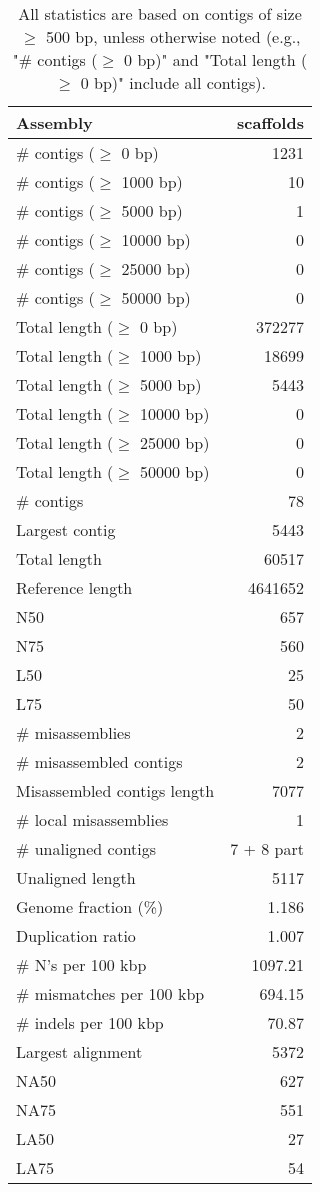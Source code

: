 \documentclass[12pt,a4paper]{article}
\begin{document}
\begin{table}[ht]
\begin{center}
\caption{All statistics are based on contigs of size $\geq$ 500 bp, unless otherwise noted (e.g., "\# contigs ($\geq$ 0 bp)" and "Total length ($\geq$ 0 bp)" include all contigs).}
\begin{tabular}{|l*{1}{|r}|}
\hline
Assembly & scaffolds \\ \hline
\# contigs ($\geq$ 0 bp) & 1231 \\ \hline
\# contigs ($\geq$ 1000 bp) & 10 \\ \hline
\# contigs ($\geq$ 5000 bp) & 1 \\ \hline
\# contigs ($\geq$ 10000 bp) & 0 \\ \hline
\# contigs ($\geq$ 25000 bp) & 0 \\ \hline
\# contigs ($\geq$ 50000 bp) & 0 \\ \hline
Total length ($\geq$ 0 bp) & 372277 \\ \hline
Total length ($\geq$ 1000 bp) & 18699 \\ \hline
Total length ($\geq$ 5000 bp) & 5443 \\ \hline
Total length ($\geq$ 10000 bp) & 0 \\ \hline
Total length ($\geq$ 25000 bp) & 0 \\ \hline
Total length ($\geq$ 50000 bp) & 0 \\ \hline
\# contigs & 78 \\ \hline
Largest contig & 5443 \\ \hline
Total length & 60517 \\ \hline
Reference length & 4641652 \\ \hline
N50 & 657 \\ \hline
N75 & 560 \\ \hline
L50 & 25 \\ \hline
L75 & 50 \\ \hline
\# misassemblies & 2 \\ \hline
\# misassembled contigs & 2 \\ \hline
Misassembled contigs length & 7077 \\ \hline
\# local misassemblies & 1 \\ \hline
\# unaligned contigs & 7 + 8 part \\ \hline
Unaligned length & 5117 \\ \hline
Genome fraction (\%) & 1.186 \\ \hline
Duplication ratio & 1.007 \\ \hline
\# N's per 100 kbp & 1097.21 \\ \hline
\# mismatches per 100 kbp & 694.15 \\ \hline
\# indels per 100 kbp & 70.87 \\ \hline
Largest alignment & 5372 \\ \hline
NA50 & 627 \\ \hline
NA75 & 551 \\ \hline
LA50 & 27 \\ \hline
LA75 & 54 \\ \hline
\end{tabular}
\end{center}
\end{table}
\end{document}
